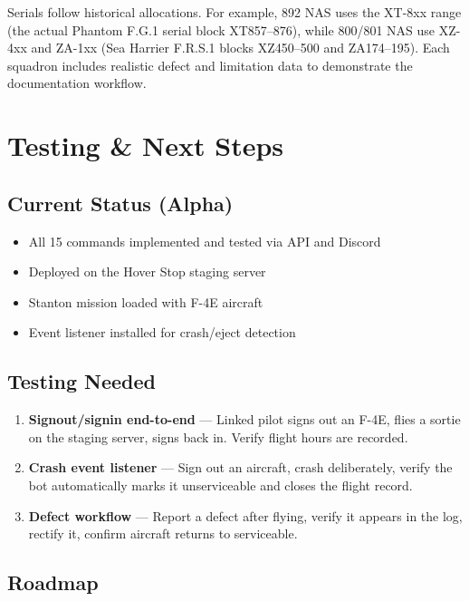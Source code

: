 \documentclass[10pt,a4paper,twocolumn]{article}
\begin{document}
\vspace{0.5em}
Serials follow historical allocations. For example, 892 NAS uses the XT-8xx range (the actual Phantom F.G.1 serial block XT857--876), while 800/801 NAS use XZ-4xx and ZA-1xx (Sea Harrier F.R.S.1 blocks XZ450--500 and ZA174--195). Each squadron includes realistic defect and limitation data to demonstrate the documentation workflow.

\section{Testing \& Next Steps}

\subsection{Current Status (Alpha)}

\begin{itemize}
    \item All 15 commands implemented and tested via API and Discord
    \item Deployed on the Hover Stop staging server
    \item Stanton mission loaded with F-4E aircraft
    \item Event listener installed for crash/eject detection
\end{itemize}

\subsection{Testing Needed}

\begin{enumerate}
    \item \textbf{Signout/signin end-to-end} --- Linked pilot signs out an F-4E, flies a sortie on the staging server, signs back in. Verify flight hours are recorded.
    \item \textbf{Crash event listener} --- Sign out an aircraft, crash deliberately, verify the bot automatically marks it unserviceable and closes the flight record.
    \item \textbf{Defect workflow} --- Report a defect after flying, verify it appears in the log, rectify it, confirm aircraft returns to serviceable.
\end{enumerate}

\subsection{Roadmap}
\end{document}
